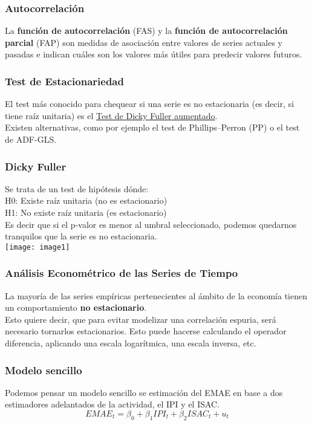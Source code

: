 \documentclass{beamer}
\begin{document}
\begin{frame}
\frametitle{Autocorrelación}
\justify
La \textbf{función de autocorrelación} (FAS) y la \textbf{función de autocorrelación parcial} (FAP) son medidas de asociación entre valores de series actuales y pasadas e indican cuáles son los valores más útiles para predecir valores futuros.
\end{frame}


\begin{frame}
\frametitle{Test de Estacionariedad}
\justify
El test más conocido para chequear si una serie es no estacionaria (es decir, si tiene raíz unitaria) es el \href{https://en.wikipedia.org/wiki/Augmented_Dickey-Fuller_test}{Test de Dicky Fuller aumentado}.\\

\vspace{5mm} %
Existen alternativas, como por ejemplo el test de Phillips–Perron (PP) o el test de ADF-GLS. 
\end{frame}

\begin{frame}
\frametitle{Dicky Fuller}
\justify
Se trata de un test de hipótesis dónde: \\
\centering
H0: Existe raíz unitaria (no es estacionario) \\
H1: No existe raíz unitaria (es estacionario) \\
\justify
Es decir que si el p-valor es menor al umbral seleccionado, podemos quedarnos tranquilos que la serie es no estacionaria. \\
\vspace{3mm} %
\texttt{[image: image1]}
\centering
\end{frame}


\begin{frame}
\frametitle{Análisis Econométrico de las Series de Tiempo}
\justify
La mayoría de las series empíricas pertenecientes al ámbito de la economía tienen un comportamiento \textbf{no estacionario}.\\
\vspace{5mm} %
Esto quiere decir, que para evitar modelizar una correlación espuria, será necesario tornarlos estacionarios. Esto puede hacerse calculando el operador diferencia, aplicando una escala logarítmica, una escala inversa, etc. 
\end{frame}


\begin{frame}
\frametitle{Modelo sencillo}
\justify
Podemos pensar un modelo sencillo se estimación del EMAE en base a dos estimadores adelantados de la actividad, el IPI y el ISAC.\\
\vspace{5mm} %
\[
EMAE_t=\beta_0+\beta_1IPI_t+\beta_2ISAC_t+u_t
\]
\end{frame}
\end{document}
